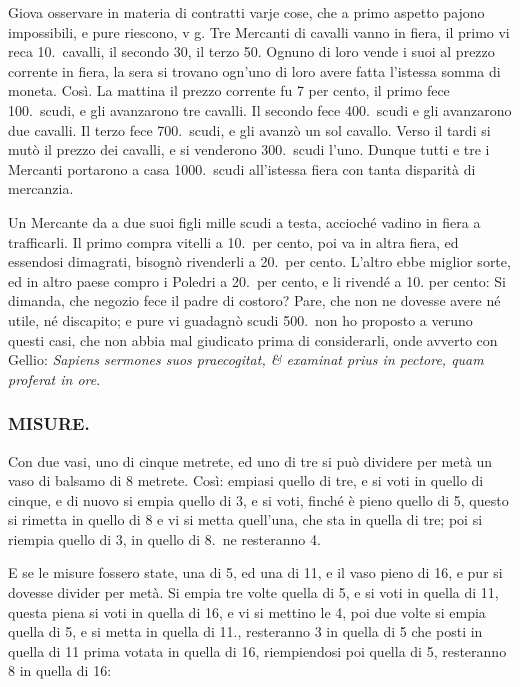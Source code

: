 \documentclass[11pt,a6paper]{article}
\begin{document}
Giova osservare in materia di contratti varje
cose, che a primo aspetto pajono impossibili, e
pure riescono, v g. Tre Mercanti di cavalli vanno in
fiera, il primo vi reca 10.\ cavalli, il secondo 30, il
terzo 50. Ognuno di loro vende i suoi al prezzo
corrente in fiera, la sera si trovano ogn'uno di loro
avere fatta l'istessa somma di moneta. Così. La mattina
il prezzo corrente fu 7 per cento, il primo fece
100.\ scudi, e gli avanzarono tre cavalli. Il secondo
fece 400.\ scudi e gli avanzarono due cavalli. Il terzo
fece 700.\ scudi, e gli avanzò un sol cavallo. Verso
il tardi si mutò il prezzo dei cavalli, e si venderono
300.\ scudi l'uno. Dunque tutti e tre i Mercanti
portarono a casa 1000.\ scudi all'istessa fiera con tanta
disparità di mercanzia.

Un Mercante da a due suoi figli mille scudi a
testa, accioché vadino in fiera a trafficarli. Il primo
compra vitelli a 10.\ per cento, poi va in altra fiera,
ed essendosi dimagrati, bisognò rivenderli a 20.\ per
cento. L'altro ebbe miglior sorte, ed in altro paese
compro i Poledri a 20.\ per cento, e li rivendé a 10.
per cento: Si dimanda, che negozio fece il padre di
costoro? Pare, che non ne dovesse avere né utile,
né discapito; e pure vi guadagnò scudi 500.\ non ho
proposto a veruno questi casi, che non abbia mal
giudicato prima di considerarli, onde avverto con
Gellio: \textit{Sapiens sermones suos praecogitat,
 \& examinat prius in pectore, quam proferat in ore}.

\subsubsection{MISURE.}

Con due vasi, uno di cinque metrete, ed uno di
tre si può dividere per metà un vaso di balsamo
di 8 metrete. Così: empiasi quello di tre, e si voti in
quello di cinque, e di nuovo si empia quello di 3, e
si voti, finché è pieno quello di 5, questo si rimetta
in quello di 8 e vi si metta quell'una, che sta in
quella di tre; poi si riempia quello di 3, in quello
di 8.\ ne resteranno 4.

E se le misure fossero state, una di 5, ed una
di 11, e il vaso pieno di 16, e pur si dovesse divider
per metà. Si empia tre volte quella di 5, e si voti in
quella di 11, questa piena si voti in quella di 16, e vi
si mettino le 4, poi due volte si empia quella di 5,
e si metta in quella di 11., resteranno 3 in quella
di 5 che posti in quella di 11 prima votata in quella
di 16, riempiendosi poi quella di 5, resteranno 8 in
quella di 16:
\end{document}
